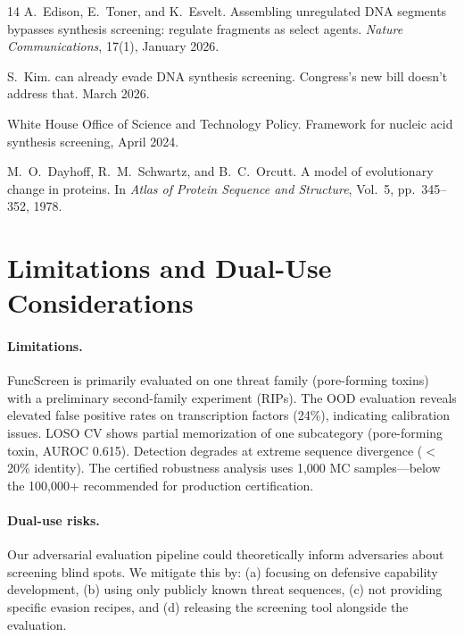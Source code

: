 \documentclass[11pt,a4paper]{article}
\begin{document}
\begin{thebibliography}{14}
A.~Edison, E.~Toner, and K.~Esvelt.
\newblock Assembling unregulated {DNA} segments bypasses synthesis screening: regulate fragments as select agents.
\newblock \emph{Nature Communications}, 17(1), January 2026.

S.~Kim.
 can already evade {DNA} synthesis screening. {Congress's} new bill doesn't address that.
\newblock March 2026.

White House Office of Science and Technology Policy.
\newblock Framework for nucleic acid synthesis screening, April 2024.

M.~O.~Dayhoff, R.~M.~Schwartz, and B.~C.~Orcutt.
\newblock A model of evolutionary change in proteins.
\newblock In \emph{Atlas of Protein Sequence and Structure}, Vol.~5, pp.~345--352, 1978.

\end{thebibliography}

\appendix
\section{Limitations and Dual-Use Considerations}

\paragraph{Limitations.}
FuncScreen is primarily evaluated on one threat family (pore-forming toxins) with a preliminary second-family experiment (RIPs). The OOD evaluation reveals elevated false positive rates on transcription factors (24\%), indicating calibration issues. LOSO CV shows partial memorization of one subcategory (pore-forming toxin, AUROC 0.615). Detection degrades at extreme sequence divergence ($<$20\% identity). The certified robustness analysis uses 1,000 MC samples---below the 100,000+ recommended for production certification.

\paragraph{Dual-use risks.}
Our adversarial evaluation pipeline could theoretically inform adversaries about screening blind spots. We mitigate this by: (a) focusing on defensive capability development, (b) using only publicly known threat sequences, (c) not providing specific evasion recipes, and (d) releasing the screening tool alongside the evaluation.
\end{document}
